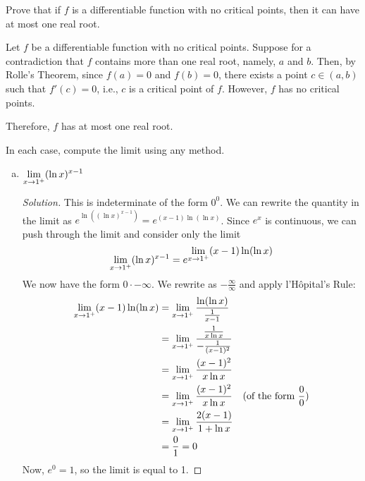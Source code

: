 \begin{prob}
  Prove that if $f$ is a differentiable function with no critical points,
  then it can have at most one real root.
\end{prob}
\begin{prf}
  Let $f$ be a differentiable function with no critical points.
  Suppose for a contradiction that $f$ contains more than one real root, namely, $a$ and $b$.
  Then, by Rolle's Theorem, since $f(a) = 0$ and $f(b) = 0$, there exists a point $c\in(a,b)$
  such that $f'(c) = 0$, i.e., $c$ is a critical point of $f$.
  However, $f$ has no critical points.

  Therefore, $f$ has at most one real root.
\end{prf}

\begin{prob}
  In each case, compute the limit using any method.
  \begin{enumerate}[(a)]
    \item $\displaystyle\lim_{x\to1^+}(\ln x)^{x-1}$
          \begin{proof}[Solution]
            This is indeterminate of the form $0^0$.
            We can rewrite the quantity in the limit as $e^{\ln((\ln x)^{x-1})} = e^{(x-1)\ln(\ln x)}$.
            Since $e^x$ is continuous, we can push through the limit and consider only the limit
            \[ \displaystyle\lim_{x\to1^+}(\ln x)^{x-1} = e^{\displaystyle\lim_{x\to1^+}(x-1)\ln(\ln x)} \]
            We now have the form $0\cdot-\infty$.
            We rewrite as $-\frac{\infty}{\infty}$ and apply l'Hôpital's Rule:
            \begin{align*}
              \displaystyle\lim_{x\to1^+}(x-1)\ln(\ln x)
               & = \displaystyle\lim_{x\to1^+}\frac{\ln(\ln x)}{\frac{1}{x-1}}                                             \\
               & = \displaystyle\lim_{x\to1^+}\frac{\frac{1}{x\ln x}}{-\frac{1}{(x-1)^2}}                                  \\
               & = \displaystyle\lim_{x\to1^+}\frac{(x-1)^2}{x \ln x}                                                      \\
               & = \displaystyle\lim_{x\to1^+}\frac{(x-1)^2}{x \ln x}                     & \text{(of the form $\frac00$)} \\
               & = \displaystyle\lim_{x\to1^+}\frac{2(x-1)}{1+\ln x}                                                       \\
               & = \frac{0}{1} = 0
            \end{align*}
            Now, $e^0 = 1$, so the limit is equal to 1.

\end{proof}
\end{enumerate}
\end{prob}
